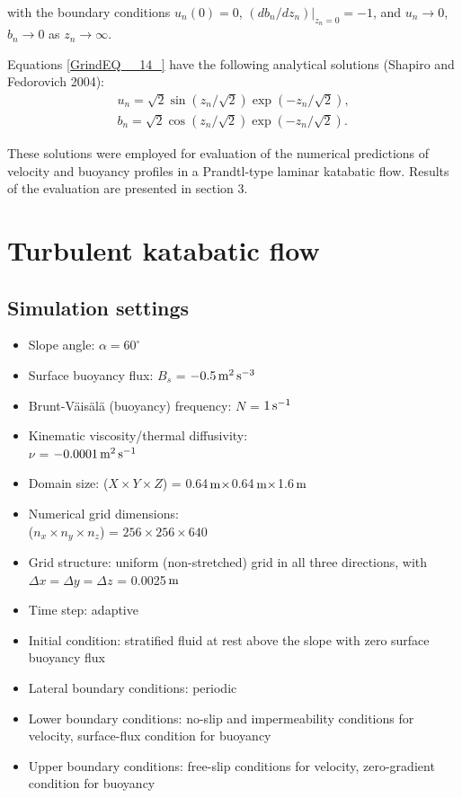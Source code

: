 \documentclass[gmd]{copernicus}
\begin{document}
\noindent with the boundary conditions $u_{n} (0)=0$, $\left. (db_{n} /dz_{n} )\right|_{z_{n} =0} =-1$, and $u_{n} \to 0$, $b_{n} \to 0$ as $z_{n} \to \infty $.

Equations \eqref{GrindEQ__14_} have the following analytical solutions (Shapiro and Fedorovich 2004):
\begin{eqnarray} \label{GrindEQ__18_} 
u_{n} =\sqrt{2} \sin (z_{n} /\sqrt{2} )\exp (-z_{n} /\sqrt{2} ),\\b_{n} =\sqrt{2} \cos (z_{n} /\sqrt{2} )\exp (-z_{n} /\sqrt{2} ).  
\end{eqnarray} 


\noindent These solutions were employed for evaluation of the numerical predictions of velocity and buoyancy profiles in a Prandtl-type laminar katabatic flow. Results of the evaluation are presented in section 3.

\section{Turbulent katabatic flow}
\smallskip

\subsection{Simulation settings}
\smallskip
\begin{itemize}
  \setlength{\itemsep}{0pt}
  \setlength{\parskip}{0pt}
  \setlength{\parsep}{0pt}  
  \item Slope angle: $\alpha = 60^{\circ}$
  \item Surface buoyancy flux: $B_{s} $ = $-0.5{\rm\, m}^{\rm 2}\, {\rm s}^{{\rm -3}} $
  \item Brunt-V\"{a}is\"{a}l\"{a} (buoyancy) frequency: $N$ = $1\,{\rm s}^{{\rm -1}}$
  \item Kinematic viscosity/thermal diffusivity:\\$\nu$ = $-0.0001{\rm\, m}^{\rm 2}\, {\rm s}^{{\rm -1}} $
  \item Domain size: ($X{\times}Y{\times}Z$) = 0.64${\rm\, m}\times$0.64${\rm\, m}\times$1.6${\rm\, m}$
  \item Numerical grid dimensions: \\($n_x{\times}n_y{\times}n_z$) = $256 \times 256 \times 640$
  \item Grid structure: uniform (non-stretched) grid in all three directions, with $\Delta x = \Delta y = \Delta z$ = 0.0025${\rm\, m}$
  \item Time step: adaptive
  \item Initial condition: stratified fluid at rest above the slope with zero surface buoyancy flux
  \item Lateral boundary conditions: periodic
  \item Lower boundary conditions: no-slip and impermeability conditions for velocity, surface-flux condition for buoyancy
  \item Upper boundary conditions: free-slip conditions for velocity, zero-gradient condition for buoyancy
\end{itemize}
\end{document}
